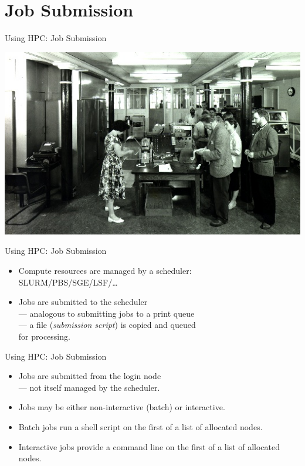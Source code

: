 
\section{Job Submission}
\begin{frame}{Using HPC: Job Submission}
\centerline{\includegraphics[width=1\textwidth]{imgs/EDSAC_2_1960.jpg}}
\end{frame}
\begin{frame}{Using HPC: Job Submission}
\begin{itemize}
\item{Compute resources are managed by a scheduler:\hfill\\\qquad\alert{SLURM}/PBS/SGE/LSF/\ldots}
\item{Jobs are submitted to the scheduler\hfill\\\qquad --- analogous to submitting jobs to a print queue\hfill\\\qquad --- a file (\emph{submission script}) is copied and queued\hfill\\\qquad \hphantom{---} for processing.}
\end{itemize}
\end{frame}

\begin{frame}{Using HPC: Job Submission}
\begin{itemize}
\item{Jobs are submitted from the \alert{login node}\hfill\\\qquad  --- not itself managed by the scheduler.}
\item{Jobs may be either non-interactive (\alert{batch}) or \alert{interactive}.}
\pause
\item{\alert{Batch} jobs run a shell script on the first of a list of allocated nodes.}
\item{\alert{Interactive} jobs provide a command line on the first of a list of allocated nodes.}
\end{itemize}
\end{frame}

